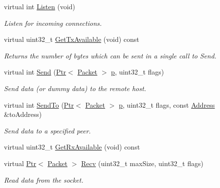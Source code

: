 \begin{DoxyCompactItemize}
virtual int \hyperlink{classns3_1_1Ipv4RawSocketImpl_aa72df8f117a1d5ba69b7591b2bd9245e}{Listen} (void)
\begin{DoxyCompactList}\small\item\em Listen for incoming connections. \end{DoxyCompactList}\item 
virtual uint32\+\_\+t \hyperlink{classns3_1_1Ipv4RawSocketImpl_afa925ad3c6fef990ec72b4ee5c0cbc2b}{Get\+Tx\+Available} (void) const 
\begin{DoxyCompactList}\small\item\em Returns the number of bytes which can be sent in a single call to Send. \end{DoxyCompactList}\item 
virtual int \hyperlink{classns3_1_1Ipv4RawSocketImpl_ae43d27d4aa516a4cacbe8f0f4f688110}{Send} (\hyperlink{classns3_1_1Ptr}{Ptr}$<$ \hyperlink{classns3_1_1Packet}{Packet} $>$ \hyperlink{lte__link__budget__x2__handover__measures_8m_ac9de518908a968428863f829398a4e62}{p}, uint32\+\_\+t flags)
\begin{DoxyCompactList}\small\item\em Send data (or dummy data) to the remote host. \end{DoxyCompactList}\item 
virtual int \hyperlink{classns3_1_1Ipv4RawSocketImpl_a06fd568d5988700a423fb2203e0aa0bf}{Send\+To} (\hyperlink{classns3_1_1Ptr}{Ptr}$<$ \hyperlink{classns3_1_1Packet}{Packet} $>$ \hyperlink{lte__link__budget__x2__handover__measures_8m_ac9de518908a968428863f829398a4e62}{p}, uint32\+\_\+t flags, const \hyperlink{classns3_1_1Address}{Address} \&to\+Address)
\begin{DoxyCompactList}\small\item\em Send data to a specified peer. \end{DoxyCompactList}\item 
virtual uint32\+\_\+t \hyperlink{classns3_1_1Ipv4RawSocketImpl_aecf377d782a4109f15952c7cccfb6f2c}{Get\+Rx\+Available} (void) const 
\item 
virtual \hyperlink{classns3_1_1Ptr}{Ptr}$<$ \hyperlink{classns3_1_1Packet}{Packet} $>$ \hyperlink{classns3_1_1Ipv4RawSocketImpl_a4716d2ee63765d9b4a35592800a20d35}{Recv} (uint32\+\_\+t max\+Size, uint32\+\_\+t flags)
\begin{DoxyCompactList}\small\item\em Read data from the socket. \end{DoxyCompactList}\item 

\end{DoxyCompactItemize}
